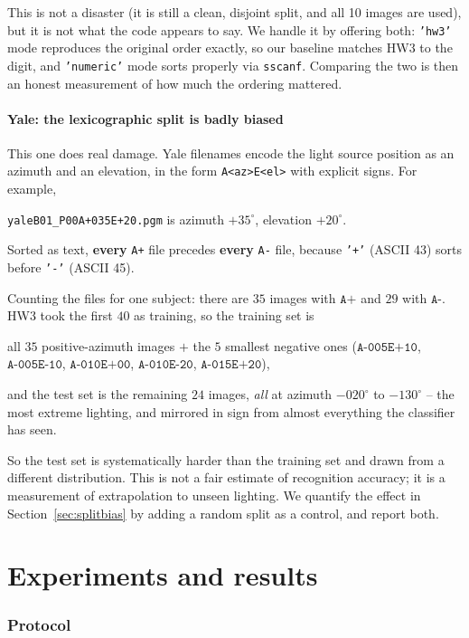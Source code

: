 \documentclass[11pt]{article}
\theoremstyle{definition}
\theoremstyle{remark}
\begin{document}
This is not a disaster (it is still a clean, disjoint split, and all 10 images are
used), but it is not what the code appears to say. We handle it by offering both:
\texttt{'hw3'} mode reproduces the original order exactly, so our baseline matches
HW3 to the digit, and \texttt{'numeric'} mode sorts properly via \texttt{sscanf}.
Comparing the two is then an honest measurement of how much the ordering mattered.

\subsection{Yale: the lexicographic split is badly biased}

This one does real damage. Yale filenames encode the light source position as an
azimuth and an elevation, in the form \texttt{A<az>E<el>} with explicit signs. For
example,
\begin{center}
\texttt{yaleB01\_P00A+035E+20.pgm} \quad is azimuth $+35^\circ$, elevation $+20^\circ$.
\end{center}
Sorted as text, \textbf{every} \texttt{A+} file precedes \textbf{every}
\texttt{A-} file, because \texttt{'+'} (ASCII 43) sorts before \texttt{'-'}
(ASCII 45).

Counting the files for one subject: there are $35$ images with $\texttt{A+}$ and
$29$ with $\texttt{A-}$. HW3 took the first $40$ as training, so the training set
is
\begin{center}
all $35$ positive-azimuth images $+$ the $5$ smallest negative ones
($\texttt{A-005E+10}$, $\texttt{A-005E-10}$, $\texttt{A-010E+00}$,
 $\texttt{A-010E-20}$, $\texttt{A-015E+20}$),
\end{center}
and the test set is the remaining $24$ images, \emph{all} at azimuth
$-020^\circ$ to $-130^\circ$ -- the most extreme lighting, and mirrored in sign
from almost everything the classifier has seen.

So the test set is systematically harder than the training set and drawn from a
different distribution. This is not a fair estimate of recognition accuracy; it is
a measurement of extrapolation to unseen lighting. We quantify the effect in
Section~\ref{sec:splitbias} by adding a random split as a control, and report both.

\part{Experiments and results}

\section{Protocol}
\end{document}
